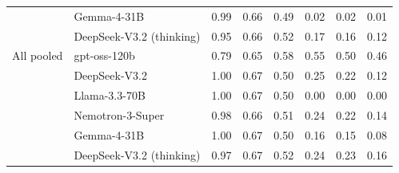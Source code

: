 \begin{tabular}{llrrrrrr}
 & Gemma-4-31B & 0.99 & 0.66 & 0.49 & 0.02 & 0.02 & 0.01 \\
 & DeepSeek-V3.2 (thinking) & 0.95 & 0.66 & 0.52 & 0.17 & 0.16 & 0.12 \\
\midrule
All pooled & gpt-oss-120b & 0.79 & 0.65 & 0.58 & 0.55 & 0.50 & 0.46 \\
 & DeepSeek-V3.2 & 1.00 & 0.67 & 0.50 & 0.25 & 0.22 & 0.12 \\
 & Llama-3.3-70B & 1.00 & 0.67 & 0.50 & 0.00 & 0.00 & 0.00 \\
 & Nemotron-3-Super & 0.98 & 0.66 & 0.51 & 0.24 & 0.22 & 0.14 \\
 & Gemma-4-31B & 1.00 & 0.67 & 0.50 & 0.16 & 0.15 & 0.08 \\
 & DeepSeek-V3.2 (thinking) & 0.97 & 0.67 & 0.52 & 0.24 & 0.23 & 0.16 \\
\bottomrule
\end{tabular}
